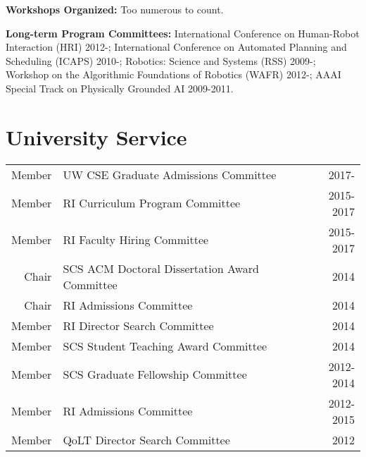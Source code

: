 
\vspace{1em}
\noindent \textbf{Workshops Organized:} Too numerous to count. 


\vspace{1em}
\noindent \textbf{Long-term Program Committees:} 
International Conference on Human-Robot Interaction (HRI) 2012-;
International Conference on Automated Planning and Scheduling (ICAPS) 2010-;
Robotics: Science and Systems (RSS) 2009-; 
Workshop on the Algorithmic Foundations of Robotics (WAFR) 2012-;
AAAI Special Track on Physically Grounded AI 2009-2011.

\section{University Service}
\begin{tabularx}{\linewidth}{rXr}
Member & UW CSE Graduate Admissions Committee & 2017- \\
Member & RI Curriculum Program Committee & 2015-2017\\
Member & RI Faculty Hiring Committee & 2015-2017\\
Chair & SCS ACM Doctoral Dissertation Award Committee & 2014\\
Chair & RI Admissions Committee & 2014 \\
Member & RI Director Search Committee & 2014 \\
Member & SCS Student Teaching Award Committee & 2014 \\
Member & SCS Graduate Fellowship Committee & 2012-2014 \\
Member & RI Admissions Committee & 2012-2015 \\
Member & QoLT Director Search Committee & 2012\\
\end{tabularx}
